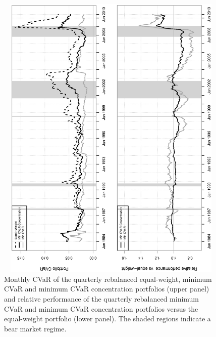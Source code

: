 \documentclass[12pt,a4paper]{article}
\begin{document}
\begin{figure}[t]
\begin{center}
\vspace{-1cm}
\caption{Monthly CVaR of the quarterly rebalanced equal-weight, minimum CVaR and minimum CVaR concentration portfolios (upper panel) and relative performance of the quarterly rebalanced minimum CVaR and minimum CVaR concentration portfolios versus the equal-weight portfolio (lower panel). The shaded regions indicate a bear market regime. \label{fig:relperformance}  }
\includegraphics[width=12cm,height=14cm,angle=270]{portfolioCVaRRelPerf_CC.eps}
\end{center}
\end{figure}
\end{document}
